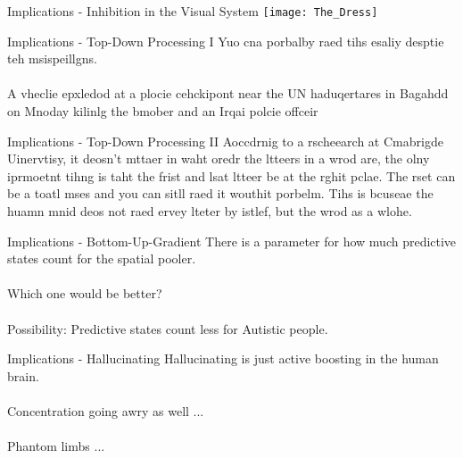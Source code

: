 \begin{frame}[c]{Implications - Inhibition in the Visual System}
    \texttt{[image: The\_Dress]}
\end{frame}



\begin{frame}[c]{Implications - Top-Down Processing I}
    \Large
    Yuo cna porbalby raed tihs esaliy desptie teh msispeillgns. \\ \\
    \pause
    A vheclie epxledod at a plocie cehckipont near the UN haduqertares in Bagahdd on Mnoday kilinlg the bmober and an Irqai polcie offceir
\end{frame}


\begin{frame}[c]{Implications - Top-Down Processing II}
    \Large
    Aoccdrnig to a rscheearch at Cmabrigde Uinervtisy, it deosn’t mttaer in waht oredr the ltteers in a wrod are, the olny iprmoetnt tihng is taht the frist and lsat ltteer be at the rghit pclae. The rset can be a toatl mses and you can sitll raed it wouthit porbelm. Tihs is bcuseae the huamn mnid deos not raed ervey lteter by istlef, but the wrod as a wlohe.
\end{frame}


\begin{frame}[c]{Implications - Bottom-Up-Gradient}
    \Large
    There is a parameter for how much predictive states count for the spatial pooler. \\ \\
    \pause
    Which one would be better? \\ \\
    \pause
    Possibility: Predictive states count less for Autistic people.
\end{frame}


\begin{frame}[c]{Implications - Hallucinating}
    \Large
    Hallucinating is just active boosting in the human brain. \\ \\
    \pause
    Concentration going awry as well ... \\ \\
    \pause
    Phantom limbs ...
\end{frame}


